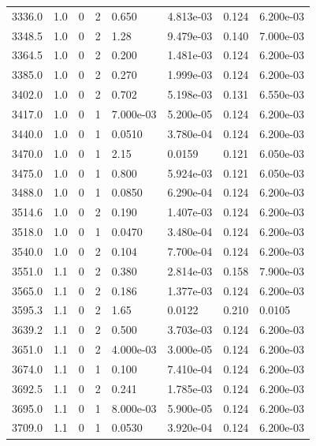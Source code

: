 \documentclass[preview]{standalone}
\begin{document}
{{{{{{\begin{tabular}{L{1.2cm}C{1.2cm} C{0.3cm}C{0.5cm} C{1.4cm}C{1.4cm} C{1.4cm}C{1.4cm}}
  3336.0  &   1.0  & 0     &  2 &  0.650  & 4.813e-03  & 0.124 &  6.200e-03   \\ 
  3348.5  &   1.0  & 0     &  2 &  1.28  & 9.479e-03  & 0.140 &  7.000e-03   \\ 
  3364.5  &   1.0  & 0     &  2 &  0.200  & 1.481e-03  & 0.124 &  6.200e-03   \\ 
  3385.0  &   1.0  & 0     &  2 &  0.270  & 1.999e-03  & 0.124 &  6.200e-03   \\ 
  3402.0  &   1.0  & 0     &  2 &  0.702  & 5.198e-03  & 0.131 &  6.550e-03   \\ 
  3417.0  &   1.0  & 0     &  1 &  7.000e-03  & 5.200e-05  & 0.124 &  6.200e-03   \\ 
  3440.0  &   1.0  & 0     &  1 &  0.0510  & 3.780e-04  & 0.124 &  6.200e-03   \\ 
  3470.0  &   1.0  & 0     &  1 &  2.15  & 0.0159  & 0.121 &  6.050e-03   \\ 
  3475.0  &   1.0  & 0     &  1 &  0.800  & 5.924e-03  & 0.121 &  6.050e-03   \\ 
  3488.0  &   1.0  & 0     &  1 &  0.0850  & 6.290e-04  & 0.124 &  6.200e-03   \\ 
  3514.6  &   1.0  & 0     &  2 &  0.190  & 1.407e-03  & 0.124 &  6.200e-03   \\ 
  3518.0  &   1.0  & 0     &  1 &  0.0470  & 3.480e-04  & 0.124 &  6.200e-03   \\ 
  3540.0  &   1.0  & 0     &  2 &  0.104  & 7.700e-04  & 0.124 &  6.200e-03   \\ 
  3551.0  &   1.1  & 0     &  2 &  0.380  & 2.814e-03  & 0.158 &  7.900e-03   \\ 
  3565.0  &   1.1  & 0     &  2 &  0.186  & 1.377e-03  & 0.124 &  6.200e-03   \\ 
  3595.3  &   1.1  & 0     &  2 &  1.65  & 0.0122  & 0.210 &  0.0105   \\ 
  3639.2  &   1.1  & 0     &  2 &  0.500  & 3.703e-03  & 0.124 &  6.200e-03   \\ 
  3651.0  &   1.1  & 0     &  2 &  4.000e-03  & 3.000e-05  & 0.124 &  6.200e-03   \\ 
  3674.0  &   1.1  & 0     &  1 &  0.100  & 7.410e-04  & 0.124 &  6.200e-03   \\ 
  3692.5  &   1.1  & 0     &  2 &  0.241  & 1.785e-03  & 0.124 &  6.200e-03   \\ 
  3695.0  &   1.1  & 0     &  1 &  8.000e-03  & 5.900e-05  & 0.124 &  6.200e-03   \\ 
  3709.0  &   1.1  & 0     &  1 &  0.0530  & 3.920e-04  & 0.124 &  6.200e-03   \\ 

\end{tabular}}}}}}}
\end{document}
